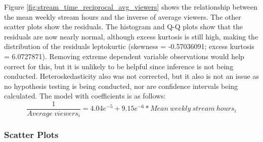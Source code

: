 \documentclass[12pt]{article}
\begin{document}

Figure \ref{fig:stream_time_reciprocal_avg_viewers} shows the relationship between the mean weekly stream hours and the inverse of average viewers. The other scatter plots show the residuals. The histogram and Q-Q plots show that the residuals are now nearly normal, although excess kurtosis is still high, making the distribution of the residuals leptokurtic (skewness = -0.57036091; excess kurtosis = 6.0727871). Removing extreme dependent variable observations would help correct for this, but it is unlikely to be helpful since inference is not being conducted. Heteroskedasticity also was not corrected, but it also is not an issue as no hypothesis testing is being conducted, nor are confidence intervals being calculated. The model with coefficients is as follows:
\begin{equation}
 \dfrac{1}{Average\ viewers_{i}} = 4.04e^{-5} + 9.15e^{-6} \ast Mean\ weekly\ stream\ hours_{i} \label{eq:reciprocal_model_w_coef}
\end{equation}

\subsubsection{Scatter Plots}\
\end{document}
